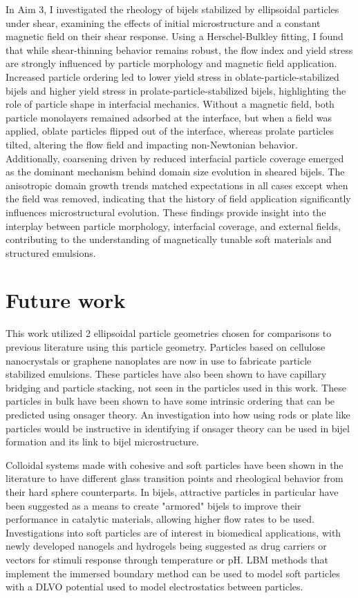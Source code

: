 In Aim 3, I investigated the rheology of bijels stabilized by ellipsoidal particles under shear, examining the effects of initial microstructure and a 
constant magnetic field on their shear response. Using a Herschel-Bulkley fitting, I found that while shear-thinning behavior remains robust, the 
flow index and yield stress are strongly influenced by particle morphology and magnetic field application. Increased particle ordering led to 
lower yield stress in oblate-particle-stabilized bijels and higher yield stress in prolate-particle-stabilized bijels, highlighting the role of particle 
shape in interfacial mechanics. Without a magnetic field, both particle monolayers remained adsorbed at the interface, but when a field was applied, 
oblate particles flipped out of the interface, whereas prolate particles tilted, altering the flow field and impacting non-Newtonian behavior. Additionally, 
coarsening driven by reduced interfacial particle coverage emerged as the dominant mechanism behind domain size evolution in sheared bijels. The anisotropic 
domain growth trends matched expectations in all cases except when the field was removed, indicating that the history of field application significantly influences 
microstructural evolution. These findings provide insight into the interplay between particle morphology, interfacial coverage, and external fields, contributing 
to the understanding of magnetically tunable soft materials and structured emulsions.

\section{Future work}

This work utilized 2 ellipsoidal particle geometries chosen for comparisons to previous literature using this 
particle geometry. Particles based on cellulose nanocrystals or graphene nanoplates are now in use to fabricate
particle stabilized emulsions. These particles have also been shown to have capillary bridging and particle stacking,
not seen in the particles used in this work. These particles in bulk have been shown to have some intrinsic ordering
that can be predicted using onsager theory. An investigation into how using rods or plate like particles would be 
instructive in identifying if onsager theory can be used in bijel formation and its link to bijel microstructure. 
\cite{tan_2d_2021}

Colloidal systems made with cohesive and soft particles have been shown in the literature to have different glass 
transition points and rheological behavior from their hard sphere counterparts. In bijels, attractive particles in 
particular have been suggested as a means to create "armored" bijels to improve their performance in catalytic materials, 
allowing higher flow rates to be used. Investigations into soft particles are of interest in biomedical
applications, with newly developed nanogels and hydrogels being suggested as drug carriers or vectors for stimuli 
response through temperature or pH. LBM methods that implement the immersed boundary method can be used to model soft
particles with a DLVO potential used to model electrostatics between particles. \cite{silva_lattice_2024}

